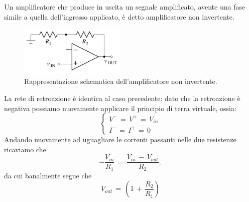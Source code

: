 Un amplificatore che produce in uscita un segnale amplificato, avente una fase simile a quella dell'ingresso applicato, è 
detto amplificatore non invertente. 
\begin{figure}[H]
    \centering
    \includegraphics[width=0.45\textwidth]{Immagini/AmplificatoreNonInvertente.png}
    \caption{Rappresentazione schematica dell'amplificatore non invertente.}
    \label{figure: OpNonAmp}
\end{figure}
La rete di retroazione è identica al caso precedente: dato che la retroazione è negativa
possiamo nuovamente applicare il principio di terra virtuale, ossia:
\begin{equation}
    \begin{cases}
        V^-\,=\,V^+\,=\,V_{in}  \\
        I^-\,=\,I^+\,=\,0
    \end{cases}
    \label{equation: TerraVirtuale}
\end{equation}
Andando nuovamente ad uguagliare le correnti passanti nelle due resistenze ricaviamo che
\begin{equation}
    -\frac{V_{in}}{R_1}\,=\,\frac{V_{in}\,-\,V_{out}}{R_2},
    \label{equation: equal_current}
\end{equation}
da cui banalmente segue che
\begin{equation}
    V_{out}\,=\,\left(1\,+\,\frac{R_2}{R_1}\right)
    \label{equation: Vout_signal}
\end{equation}

